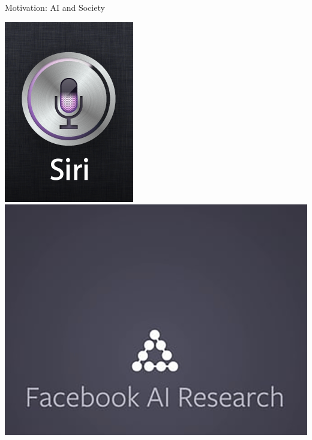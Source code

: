 \documentclass[xcolor=x11names]{beamer}
\begin{document}
\begin{frame}{Motivation: AI and Society}
\begin{center}
  \includegraphics[height=0.4\textheight]{res/siri.png}
  \hspace*{1em}
  \includegraphics[height=0.4\textheight]{res/facebook-ai-research.png}
  \hspace*{1em}

\end{center}
\end{frame}
\end{document}
